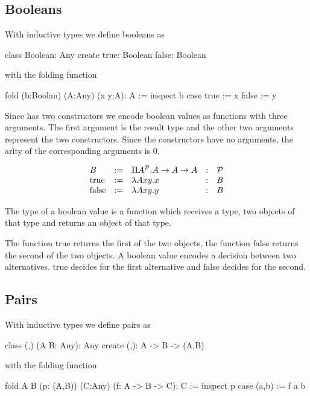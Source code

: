 \subsection{Booleans}

With inductive types we define booleans as
\begin{alba}
  class Boolean: Any create
    true:  Boolean
    false: Boolean
\end{alba}
%
with the folding function
%
\begin{alba}
  fold (b:Boolan) (A:Any) (x y:A): A :=
    inspect b case
      true :=
         x
      false :=
         y
\end{alba}


Since  has two constructors we encode boolean values as
functions with three arguments. The first argument is the result type and the
other two arguments represent the two constructors. Since the constructors
have no arguments, the arity of the corresponding arguments is 0.

$$
\begin{array}{lllll}
  B & :=
  & \Pi A^{\cal{P}} . A \to A \to A
  &:
  & {\cal{P}}
  \\
  \text{true} &:=
  & \lambda A x y . x
  &: & B
  \\
  \text{false} &:=
  & \lambda A x y . y
  &: & B
\end{array}
$$

The type of a boolean value is a function which receives a type, two objects
of that type and returns an object of that type.

The function $\text{true}$ returns the first of the two objects, the function
$\text{false}$ returns the second of the two objects. A boolean value encodes
a decision between two alternatives.  $\text{true}$ decides for the first
alternative and $\text{false}$ decides for the second.



\subsection{Pairs}

With inductive types we define pairs as
\begin{alba}
  class (,) (A B: Any): Any create
    (,): A -> B -> (A,B)
\end{alba}
%
with the folding function
%
\begin{alba}
  fold A B (p: (A,B)) (C:Any) (f: A -> B -> C): C :=
    inspect p case
      (a,b) :=
         f a b
\end{alba}

